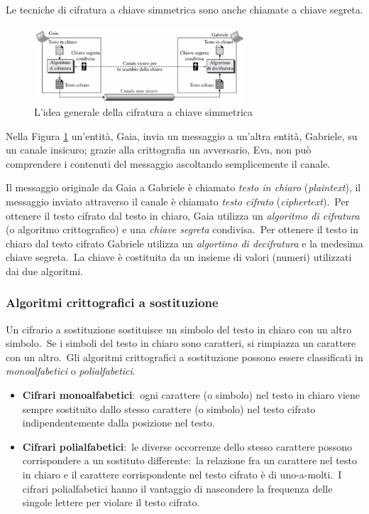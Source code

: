 \begin{center}
    Le tecniche di cifratura a chiave simmetrica sono anche chiamate a chiave segreta.
\end{center}
\begin{figure}[H]
    \centering
    \includegraphics[width=0.7\textwidth]{immagini/Cifratura_simmetrica.png}
    \caption{L'idea generale della cifratura a chiave simmetrica}
    \label{fig:cifratura_simmetrica}
\end{figure}
Nella Figura \ref{fig:cifratura_simmetrica} un'entità, Gaia, invia un messaggio a un'altra entità, Gabriele, su un canale insicuro; grazie alla crittografia un avversario, Eva, non può comprendere i contenuti del messaggio ascoltando semplicemente il canale.

Il messaggio originale da Gaia a Gabriele è chiamato \textit{testo in chiaro} (\textit{plaintext}), il messaggio inviato attraverso il canale è chiamato \textit{testo cifrato} (\textit{ciphertext}).\
Per ottenere il testo cifrato dal testo in chiaro, Gaia utilizza un \textit{algoritmo di cifratura} (o algoritmo crittografico) e una \textit{chiave segreta} condivisa.\
Per ottenere il testo in chiaro dal testo cifrato Gabriele utilizza un \textit{algortimo di decifratura} e la medesima chiave segreta.\
La chiave è costituita da un insieme di valori (numeri) utilizzati dai due algoritmi.

\subsubsection{Algoritmi crittografici a sostituzione}

Un cifrario a sostituzione sostituisce un simbolo del testo in chiaro con un altro simbolo.\
Se i simboli del testo in chiaro sono caratteri, si rimpiazza un carattere con un altro.\
Gli algoritmi crittografici a sostituzione possono essere classificati in \textit{monoalfabetici} o \textit{polialfabetici}.
\begin{itemize}
    \item \textbf{Cifrari monoalfabetici}:\ ogni carattere (o simbolo) nel testo in chiaro viene sempre sostituito dallo stesso carattere (o simbolo) nel testo cifrato indipendentemente dalla posizione nel testo.
    \item \textbf{Cifrari polialfabetici}:\ le diverse occorrenze dello stesso carattere possono corrispondere a un sostituto differente:\ la relazione fra un carattere nel testo in chiaro e il carattere corrispondente nel testo cifrato è di uno-a-molti.\
          I cifrari polialfabetici hanno il vantaggio di nascondere la frequenza delle singole lettere per violare il testo cifrato.
\end{itemize}

